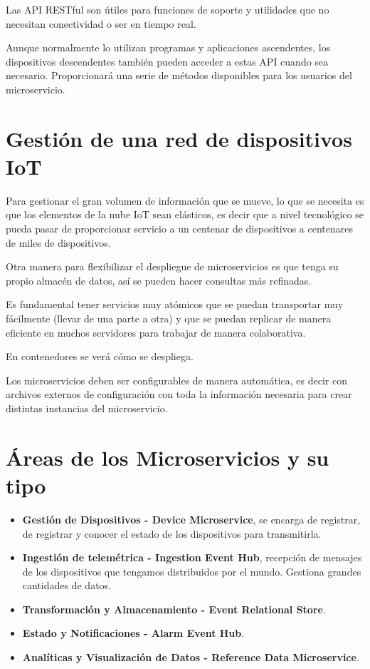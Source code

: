 \documentclass[12pt]{report} %
\begin{document}
Las API RESTful son útiles para funciones de soporte y utilidades que no necesitan conectividad o ser en tiempo real.

Aunque normalmente lo utilizan programas y aplicaciones ascendentes, los dispositivos descendentes también pueden acceder a estas API cuando sea necesario. Proporcionará una serie de métodos disponibles para los usuarios del microservicio.


\section{Gestión de una red de dispositivos IoT}
Para gestionar el gran volumen de información que se mueve, lo que se necesita es que los elementos de la nube IoT sean elásticos, es decir que a nivel tecnológico se pueda pasar de proporcionar servicio a un centenar de dispositivos a centenares de miles de dispositivos.

Otra manera para flexibilizar el despliegue de microservicios es que tenga su propio almacén de datos, así se pueden hacer consultas más refinadas.

Es fundamental tener servicios muy atómicos que se puedan transportar muy fácilmente (llevar de una parte a otra) y que se puedan replicar de manera eficiente en muchos servidores para trabajar de manera colaborativa.

En contenedores se verá cómo se despliega.

Los microservicios deben ser configurables de manera automática, es decir con archivos externos de configuración con toda la información necesaria para crear distintas instancias del microservicio.

\section{Áreas de los Microservicios y su tipo}
\begin{itemize}
	\item \textbf{Gestión de Dispositivos - Device Microservice}, se encarga de registrar, de registrar y conocer el estado de los dispositivos para transmitirla.
	\item \textbf{Ingestión de telemétrica - Ingestion Event Hub}, recepción de mensajes de los dispositivos que tengamos distribuidos por el mundo. Gestiona grandes cantidades de datos.
	\item \textbf{Transformación y Almacenamiento - Event Relational Store}. 
	\item \textbf{Estado y Notificaciones - Alarm Event Hub}.
	\item \textbf{Analíticas y Visualización de Datos - Reference Data Microservice}. 
\end{itemize}
\end{document}
